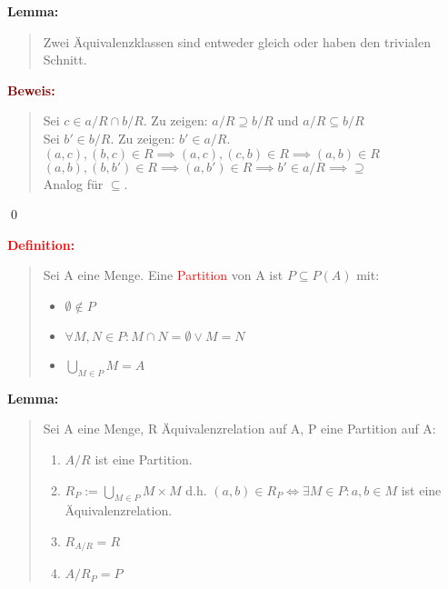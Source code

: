 \documentclass{article}
\newcommand{\red}[1]{\textcolor{red}{#1}}
\newcommand{\dgr}[1]{\textcolor{dgr}{#1}}
\newcommand{\maroon}[1]{\textcolor{maroon}{#1}}
\newcommand{\de}[1]{\red{\textbf{Definition: }}\begin{quote}#1\end{quote}}
\newcommand{\lem}[1]{\dgr{\textbf{Lemma: }}\begin{quote}#1\end{quote}}
\newcommand{\pr}[1]{\maroon{\textbf{Beweis: }}\begin{quote}#1\end{quote}\qed}
\begin{document}
\lem{
    Zwei Äquivalenzklassen sind entweder gleich oder haben den trivialen Schnitt.
}

\pr{
    Sei $c \in a/R \cap b/R$. Zu zeigen: $a/R \supseteq b/R$ und $a/R \subseteq b/R$\\
    Sei $b' \in b/R$. Zu zeigen: $b' \in a/R$.\\
    $(a,c),(b,c) \in R \implies (a,c),(c,b) \in R \implies (a,b) \in R$\\
    $(a,b), (b,b') \in R \implies (a,b') \in R \implies b' \in a/R \implies \supseteq$\\
    Analog für $\subseteq$.
}

\de{
    Sei A eine Menge. Eine \red{Partition} von A ist $P \subseteq P(A)$ mit:
    \begin{itemize}
        \item $\emptyset \notin P$
        \item $\forall M,N \in P: M \cap N = \emptyset \lor M = N$
        \item $\bigcup_{M \in P}M = A$
    \end{itemize}
}

\newpage
\lem{
    Sei A eine Menge, R Äquivalenzrelation auf A, P eine Partition auf A:
    \begin{enumerate}
        \item $A/R$ ist eine Partition.
        \item $R_P := \bigcup_{M \in P} M \times M$ d.h. $(a,b) \in R_P \iff \exists M \in P: a,b \in M$ ist eine Äquivalenzrelation.
        \item $R_{A/R} = R$
        \item $A/R_P = P$
    \end{enumerate}
}
\end{document}
